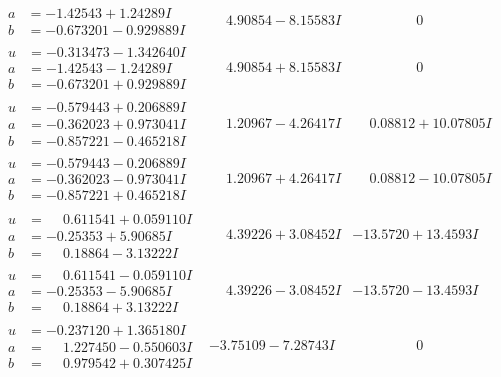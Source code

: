\documentclass[1p]{elsarticle_modified}
\theoremstyle{definition}
\begin{document}
$$\begin{array}{c|c|c}
\begin{aligned}
a &= -1.42543 + 1.24289 I \\
b &= -0.673201 - 0.929889 I\end{aligned}
 & \phantom{-}4.90854 - 8.15583 I & \phantom{-0.000000 } 0 \\ \hline\begin{aligned}
u &= -0.313473 - 1.342640 I \\
a &= -1.42543 - 1.24289 I \\
b &= -0.673201 + 0.929889 I\end{aligned}
 & \phantom{-}4.90854 + 8.15583 I & \phantom{-0.000000 } 0 \\ \hline\begin{aligned}
u &= -0.579443 + 0.206889 I \\
a &= -0.362023 + 0.973041 I \\
b &= -0.857221 - 0.465218 I\end{aligned}
 & \phantom{-}1.20967 - 4.26417 I & \phantom{-}0.08812 + 10.07805 I \\ \hline\begin{aligned}
u &= -0.579443 - 0.206889 I \\
a &= -0.362023 - 0.973041 I \\
b &= -0.857221 + 0.465218 I\end{aligned}
 & \phantom{-}1.20967 + 4.26417 I & \phantom{-}0.08812 - 10.07805 I \\ \hline\begin{aligned}
u &= \phantom{-}0.611541 + 0.059110 I \\
a &= -0.25353 + 5.90685 I \\
b &= \phantom{-}0.18864 - 3.13222 I\end{aligned}
 & \phantom{-}4.39226 + 3.08452 I & -13.5720 + 13.4593 I \\ \hline\begin{aligned}
u &= \phantom{-}0.611541 - 0.059110 I \\
a &= -0.25353 - 5.90685 I \\
b &= \phantom{-}0.18864 + 3.13222 I\end{aligned}
 & \phantom{-}4.39226 - 3.08452 I & -13.5720 - 13.4593 I \\ \hline\begin{aligned}
u &= -0.237120 + 1.365180 I \\
a &= \phantom{-}1.227450 - 0.550603 I \\
b &= \phantom{-}0.979542 + 0.307425 I\end{aligned}
 & -3.75109 - 7.28743 I & \phantom{-0.000000 } 0 \\ \hline\begin{aligned}

\end{aligned}
\end{array}$$
\end{document}
